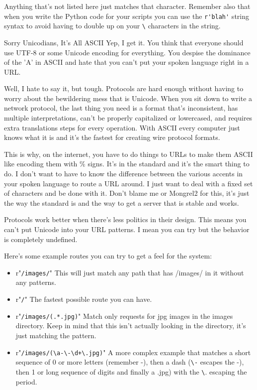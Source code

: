 Anything that's not listed here just matches that character.  Remember also that when you write the Python
code for your scripts you can use the \verb|r'blah'| string syntax to avoid having to double up on your
\verb|\| characters in the string.

\begin{aside}{Sorry Unicodians, It's All ASCII}
Yep, I get it.  You think that everyone should use UTF-8 or some Unicode encoding for everything.
You despise the dominance of the 'A' in ASCII and hate that you can't put your spoken language
right in a URL.

Well, I hate to say it, but tough.  Protocols are hard enough without having to
worry about the bewildering mess that is Unicode.  When you sit down to write a
network protocol, the last thing you need is a format that's inconsistent, has
multiple interpretations, can't be properly capitalized or lowercased, and
requires extra translations steps for every operation.  With ASCII every
computer just knows what it is and it's the fastest for creating wire protocol
formats.

This is why, on the internet, you have to do things to URLs to make them ASCII
like encoding them with \% signs.  It's in the standard and it's the smart
thing to do.  I don't want to have to know the difference between the various
accents in your spoken language to route a URL around.  I just want to deal
with a fixed set of characters and be done with it.  Don't blame me or Mongrel2
for this, it's just the way the standard is and the way to get a server that is
stable and works.

Protocols work better when there's less politics in their design.  This means
you can't put Unicode into your URL patterns.  I mean you can try but the
behavior is completely undefined.

\end{aside}


Here's some example routes you can try to get a feel for the system:

\begin{itemize}
\item r"\verb|/images/|"  This will just match any path that has /images/ in it without any patterns.
\item r"\verb|/|" The fastest possible route you can have.
\item r"\verb|/images/(.*.jpg)|" Match only requests for jpg images in the images directory.  Keep in mind that this
    isn't actually looking in the directory, it's just matching the  pattern.
\item r"\verb|/images/(\a-\-\d+\.jpg)|" A more complex example that matches a short sequence of 0 or more letters (remember -), then a dash
    (\verb|\-| escapes the -), then 1 or long sequence of digits and finally a .jpg) with the \verb|\|. escaping the period.
\end{itemize}

